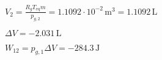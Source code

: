 \( V_2 = \frac{R_g T_{\text{eq}} m}{p_{g,2}} = 1.1092 \cdot 10^{-2} \, \text{m}^3 = 1.1092 \, \text{L} \)  

\( \Delta V = -2.031 \, \text{L} \)  

\( W_{12} = p_{g,1} \Delta V = -284.3 \, \text{J} \)